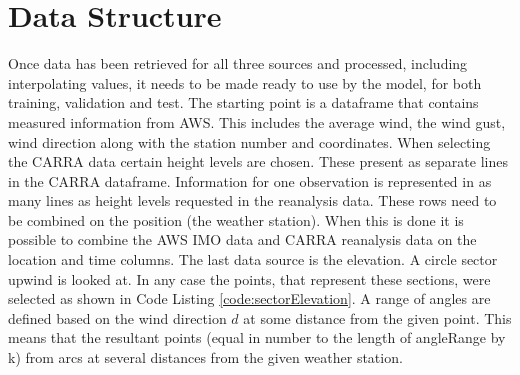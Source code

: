 \begin{table}[h]
    \caption[Mean absolute difference of measured wind speed and reanalysis wind speed at select stations]{Mean absolute error for reanalysis wind speed as compared to measured wind speed, for the five stations with the highest difference and the five stations with the lowest difference.}
    \label{table:station_mae_distribution}
\end{table}

\section{Data Structure}

Once data has been retrieved for all three sources and processed, including interpolating values, it needs to be made ready to use by the model, for both training, validation and test. The starting point is a dataframe that contains measured information from AWS. This includes the average wind, the wind gust, wind direction along with the station number and coordinates. When selecting the CARRA data certain height levels are chosen. These present as separate lines in the CARRA dataframe. Information for one observation is represented in as many lines as height levels requested in the reanalysis data. These rows need to be combined on the position (the weather station). When this is done it is possible to combine the AWS IMO data and CARRA reanalysis data on the location and time columns. The last data source is the elevation. A circle sector upwind is looked at. In any case the points, that represent these sections, were selected as shown in Code Listing \ref{code:sectorElevation}. A range of angles are defined based on the wind direction $d$ at some distance from the given point. This means that the resultant points (equal in number to the length of angleRange by k) from arcs at several distances from the given weather station.

